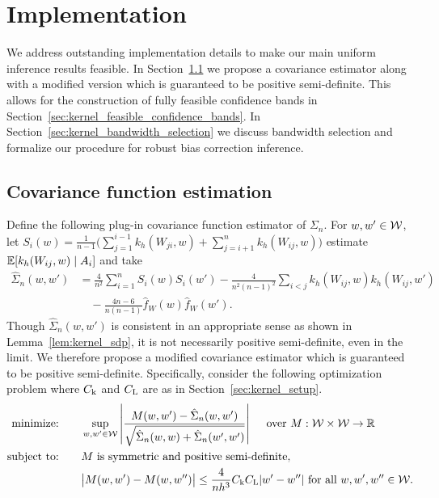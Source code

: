 \section{Implementation}
\label{sec:kernel_implementation}

We address outstanding implementation details to make our main uniform
inference results feasible. In Section~\ref{sec:kernel_covariance_estimation} we
propose a covariance estimator along with a modified version which is
guaranteed to be positive semi-definite. This allows for the construction of
fully feasible confidence bands in
Section~\ref{sec:kernel_feasible_confidence_bands}.
In Section~\ref{sec:kernel_bandwidth_selection} we discuss bandwidth selection
and
formalize our procedure for robust bias correction inference.

\subsection{Covariance function estimation}
\label{sec:kernel_covariance_estimation}

Define the following plug-in covariance function
estimator of $\Sigma_n$. For $w, w' \in \mathcal{W}$,
let $S_i(w) = \frac{1}{n-1} \big( \sum_{j = 1}^{i-1} k_h(W_{j i}, w)
+ \sum_{j = i+1}^n k_h(W_{i j}, w) \big)$
estimate $\mathbb{E}[k_h(W_{i j},w) \mid A_i]$ and take
%
\begin{align*}
  \hat \Sigma_n(w,w')
  &= \frac{4}{n^2} \sum_{i=1}^n S_i(w) S_i(w')
  - \frac{4}{n^2(n-1)^2} \sum_{i<j} k_h(W_{i j},w) k_h(W_{i j},w') \\
  &\quad- \frac{4n-6}{n(n-1)} \hat f_W(w) \hat f_W(w').
\end{align*}
%
Though $\hat\Sigma_n(w,w')$ is consistent in an appropriate sense as shown in
Lemma~\ref{lem:kernel_sdp}, it is not necessarily positive semi-definite, even
in the limit. We therefore propose a modified covariance estimator which is
guaranteed to be positive semi-definite. Specifically, consider the following
optimization problem where $C_{\mathrm{k}}$ and $C_{\mathrm{L}}$ are as in
Section~\ref{sec:kernel_setup}.
%
\begin{equation}
  \label{eq:kernel_sdp}
  \begin{aligned}
    \operatorname*{minimize:}
    \qquad
    & \sup_{w,w' \in \mathcal{W}}
    \left|
    \frac{M(w,w') - \hat\Sigma_n(w,w')}
    {\sqrt{\hat \Sigma_n(w,w) + \hat \Sigma_n(w',w')}}
    \right|
    \quad \textup{ over } M: \mathcal{W} \times \mathcal{W} \to \mathbb{R}
    \\
    \operatorname*{subject\ to:}
    \qquad
    & M \textup{ is symmetric and positive semi-definite}, \\
    & \big|M(w,w') - M(w, w'')\big|
    \leq \frac{4}{n h^3}
    C_{\mathrm{k}} C_{\mathrm{L}}
    |w'-w''|
    \textup{ for all }
    w, w', w'' \in \mathcal{W}.
  \end{aligned}
\end{equation}


